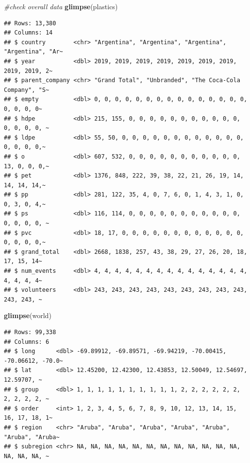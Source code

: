 \documentclass[
]{article}
\newenvironment{Shaded}{\begin{snugshade}}{\end{snugshade}}
\newcommand{\CommentTok}[1]{\textcolor[rgb]{0.56,0.35,0.01}{\textit{#1}}}
\newcommand{\FunctionTok}[1]{\textcolor[rgb]{0.13,0.29,0.53}{\textbf{#1}}}
\newcommand{\NormalTok}[1]{#1}
\begin{document}
\begin{Shaded}
\begin{Highlighting}[]
\CommentTok{\#check overall data}
\FunctionTok{glimpse}\NormalTok{(plastics)}
\end{Highlighting}
\end{Shaded}

\begin{verbatim}
## Rows: 13,380
## Columns: 14
## $ country        <chr> "Argentina", "Argentina", "Argentina", "Argentina", "Ar~
## $ year           <dbl> 2019, 2019, 2019, 2019, 2019, 2019, 2019, 2019, 2019, 2~
## $ parent_company <chr> "Grand Total", "Unbranded", "The Coca-Cola Company", "S~
## $ empty          <dbl> 0, 0, 0, 0, 0, 0, 0, 0, 0, 0, 0, 0, 0, 0, 0, 0, 0, 0, 0~
## $ hdpe           <dbl> 215, 155, 0, 0, 0, 0, 0, 0, 0, 0, 0, 0, 0, 0, 0, 0, 0, ~
## $ ldpe           <dbl> 55, 50, 0, 0, 0, 0, 0, 0, 0, 0, 0, 0, 0, 0, 0, 0, 0, 0,~
## $ o              <dbl> 607, 532, 0, 0, 0, 0, 0, 0, 0, 0, 0, 0, 0, 13, 0, 0, 0,~
## $ pet            <dbl> 1376, 848, 222, 39, 38, 22, 21, 26, 19, 14, 14, 14, 14,~
## $ pp             <dbl> 281, 122, 35, 4, 0, 7, 6, 0, 1, 4, 3, 1, 0, 0, 3, 0, 4,~
## $ ps             <dbl> 116, 114, 0, 0, 0, 0, 0, 0, 0, 0, 0, 0, 0, 0, 0, 0, 0, ~
## $ pvc            <dbl> 18, 17, 0, 0, 0, 0, 0, 0, 0, 0, 0, 0, 0, 0, 0, 0, 0, 0,~
## $ grand_total    <dbl> 2668, 1838, 257, 43, 38, 29, 27, 26, 20, 18, 17, 15, 14~
## $ num_events     <dbl> 4, 4, 4, 4, 4, 4, 4, 4, 4, 4, 4, 4, 4, 4, 4, 4, 4, 4, 4~
## $ volunteers     <dbl> 243, 243, 243, 243, 243, 243, 243, 243, 243, 243, 243, ~
\end{verbatim}

\begin{Shaded}
\begin{Highlighting}[]
\FunctionTok{glimpse}\NormalTok{(world)}
\end{Highlighting}
\end{Shaded}

\begin{verbatim}
## Rows: 99,338
## Columns: 6
## $ long      <dbl> -69.89912, -69.89571, -69.94219, -70.00415, -70.06612, -70.0~
## $ lat       <dbl> 12.45200, 12.42300, 12.43853, 12.50049, 12.54697, 12.59707, ~
## $ group     <dbl> 1, 1, 1, 1, 1, 1, 1, 1, 1, 1, 2, 2, 2, 2, 2, 2, 2, 2, 2, 2, ~
## $ order     <int> 1, 2, 3, 4, 5, 6, 7, 8, 9, 10, 12, 13, 14, 15, 16, 17, 18, 1~
## $ region    <chr> "Aruba", "Aruba", "Aruba", "Aruba", "Aruba", "Aruba", "Aruba~
## $ subregion <chr> NA, NA, NA, NA, NA, NA, NA, NA, NA, NA, NA, NA, NA, NA, NA, ~
\end{verbatim}
\end{document}
